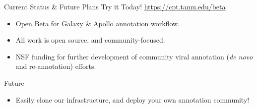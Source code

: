 \documentclass[final,t]{beamer}
\begin{document}
\begin{frame}[fragile]
\begin{columns}[t]
\begin{column}{.36\linewidth}
            \begin{block}{Current Status \& Future Plans}
                Try it Today! \url{https://cpt.tamu.edu/beta}
                \begin{itemize}
                    \item Open Beta for Galaxy \& Apollo annotation workflow.
                    \item All work is open source, and community-focused.
                    \item NSF funding for further development of community
                        viral annotation (\emph{de novo} and re-annotation) efforts.
                \end{itemize}
                Future
                \begin{itemize}
                    \item Easily clone our infrastructure, and deploy your own
                        annotation community!
                \end{itemize}
            \end{block}


\end{column}
\end{columns}
\end{frame}
\end{document}
